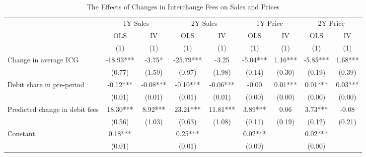 \documentclass[11pt,english]{article}
\theoremstyle{remark}
\begin{document}
\begin{table}[H]
\caption{The Effects of Changes in Interchange Fees on Sales and Prices\label{tab:durbin-iv-nosurcharge}}

\begin{centering}
{\tiny{
\def\sym#1{\ifmmode^{#1}\else\(^{#1}\)\fi}
\begin{tabular}{l*{8}{c}}
\toprule
                    &\multicolumn{2}{c}{1Y Sales}               &\multicolumn{2}{c}{2Y Sales}               &\multicolumn{2}{c}{1Y Price}               &\multicolumn{2}{c}{2Y Price}               \\
                    &\multicolumn{1}{c}{OLS}&\multicolumn{1}{c}{IV}&\multicolumn{1}{c}{OLS}&\multicolumn{1}{c}{IV}&\multicolumn{1}{c}{OLS}&\multicolumn{1}{c}{IV}&\multicolumn{1}{c}{OLS}&\multicolumn{1}{c}{IV}\\
                    &         (1)         &         (1)         &         (1)         &         (1)         &         (1)         &         (1)         &         (1)         &         (1)         \\
\midrule
Change in average ICG&      -18.93***&       -3.75*  &      -25.79***&       -3.25         &       -5.04***&        1.16***&       -5.85***&        1.68***\\
                    &      (0.77)         &      (1.59)         &      (0.97)         &      (1.98)         &      (0.14)         &      (0.30)         &      (0.19)         &      (0.39)         \\

Debit share in pre-period&       -0.12***&       -0.08***&       -0.10***&       -0.06***&       -0.00         &        0.01***&        0.01***&        0.03***\\
                    &      (0.01)         &      (0.01)         &      (0.01)         &      (0.01)         &      (0.00)         &      (0.00)         &      (0.00)         &      (0.00)         \\

Predicted change in debit fees&       18.30***&        8.92***&       23.21***&       11.81***&        3.89***&        0.06         &        3.73***&       -0.08         \\
                    &      (0.56)         &      (1.03)         &      (0.63)         &      (1.08)         &      (0.11)         &      (0.19)         &      (0.12)         &      (0.21)         \\

Constant            &        0.18***&                     &        0.25***&                     &        0.02***&                     &        0.02***&                     \\
                    &      (0.01)         &                     &      (0.01)         &                     &      (0.00)         &                     &      (0.00)         &                     \\


\end{tabular}}}
\end{centering}
\end{table}
\end{document}

